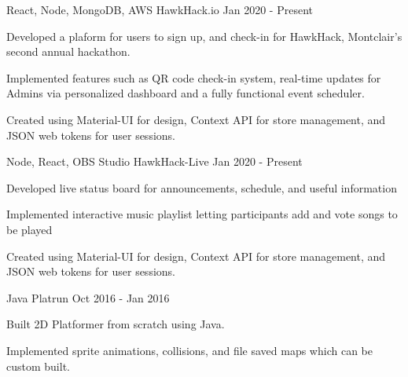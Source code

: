 

\begin{cventries}
  \cventry
    {React, Node, MongoDB, AWS} %
    {HawkHack.io} %
    {} %
    {Jan 2020 - Present} %
    {
      \begin{cvitems} %
        \item {Developed a plaform for users to sign up, and check-in for HawkHack, Montclair's second annual hackathon.}
        \item{Implemented features such as QR code check-in system, real-time updates for Admins via personalized dashboard and a fully functional event scheduler.}
        \item{Created using Material-UI for design, Context API for store management, and JSON web tokens for user sessions.}
      \end{cvitems}
    }
    
    \cventry
    {Node, React, OBS Studio} %
    {HawkHack-Live} %
    {} %
    {Jan 2020 - Present} %
    {
      \begin{cvitems} %
        \item {Developed live status board for announcements, schedule, and useful information}
        \item{Implemented interactive music playlist letting participants add and vote songs to be played}
        \item{Created using Material-UI for design, Context API for store management, and JSON web tokens for user sessions.}
      \end{cvitems}
    }
    
    \cventry
    {Java} %
    {Platrun} %
    {} %
    {Oct 2016 - Jan 2016} %
    {
      \begin{cvitems} %
        \item {Built 2D Platformer from scratch using Java.}
        \item{Implemented sprite animations, collisions, and file saved maps which can be custom built.}
      \end{cvitems}
    }

\end{cventries}


